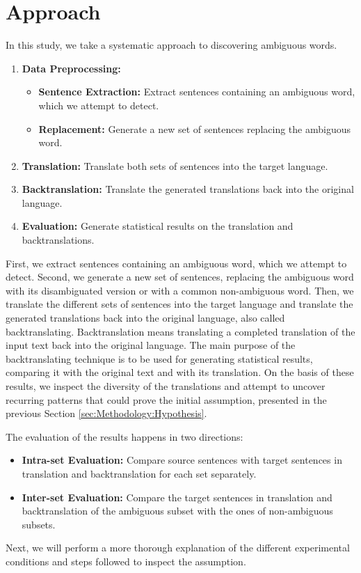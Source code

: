 \section{Approach}
\label{sec:Methodology:Approach}


In this study, we take a systematic approach to discovering ambiguous words. 

\begin{enumerate}
  \item \textbf{Data Preprocessing:}
  \begin{itemize}
    \item \textbf{Sentence Extraction:} Extract sentences containing an ambiguous word, which we attempt to detect.
    \item \textbf{Replacement:} Generate a new set of sentences replacing the ambiguous word.
  \end{itemize}
  \item \textbf{Translation:} Translate both sets of sentences into the target language.
  \item \textbf{Backtranslation:} Translate the generated translations back into the original language.
  \item \textbf{Evaluation:} Generate statistical results on the translation and backtranslations.
\end{enumerate}

First, we extract sentences containing an ambiguous word, which we attempt to detect. Second, we generate a new set of sentences, replacing the ambiguous word with its disambiguated version or with a common non-ambiguous word. Then, we translate the different sets of sentences into the target language and translate the generated translations back into the original language, also called backtranslating.
Backtranslation means translating a completed translation of the input text back into the original language. The main purpose of the backtranslating technique is to be used for generating statistical results, comparing it with the original text and with its translation. On the basis of these results, we inspect the diversity of the translations and attempt to uncover recurring patterns that could prove the initial assumption, presented in the previous Section \ref{sec:Methodology:Hypothesis}. 

The evaluation of the results happens in two directions:
\begin{itemize}
    \item \textbf{Intra-set Evaluation:} Compare source sentences with target sentences in translation and backtranslation for each set separately.
    \item \textbf{Inter-set Evaluation:} Compare the target sentences in translation and backtranslation of the ambiguous subset with the ones of non-ambiguous subsets.
\end{itemize}

Next, we will perform a more thorough explanation of the different experimental conditions and steps followed to inspect the assumption.



